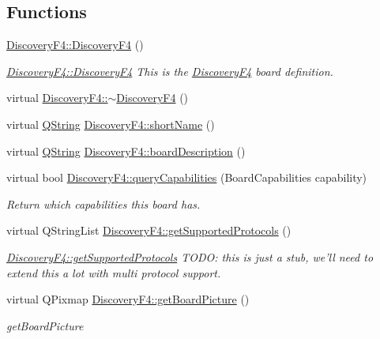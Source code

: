 \subsection*{Functions}
\begin{DoxyCompactItemize}
\item 
\hyperlink{group___boards___stm_gac87884749e97c313a7ae0f297c4fea34}{Discovery\-F4\-::\-Discovery\-F4} ()
\begin{DoxyCompactList}\small\item\em \hyperlink{group___boards___stm_gac87884749e97c313a7ae0f297c4fea34}{Discovery\-F4\-::\-Discovery\-F4} This is the \hyperlink{class_discovery_f4}{Discovery\-F4} board definition. \end{DoxyCompactList}\item 
virtual \hyperlink{group___boards___stm_ga9efdcb4c04776b36e256d689941943ea}{Discovery\-F4\-::$\sim$\-Discovery\-F4} ()
\item 
virtual \hyperlink{group___u_a_v_objects_plugin_gab9d252f49c333c94a72f97ce3105a32d}{Q\-String} \hyperlink{group___boards___stm_ga5c9636450b313e75d14d0277542ca1b7}{Discovery\-F4\-::short\-Name} ()
\item 
virtual \hyperlink{group___u_a_v_objects_plugin_gab9d252f49c333c94a72f97ce3105a32d}{Q\-String} \hyperlink{group___boards___stm_gaaa661c5a3b6c7fe84f8736ce1c090860}{Discovery\-F4\-::board\-Description} ()
\item 
virtual bool \hyperlink{group___boards___stm_ga81561678eef8f622b3cfe9f7af2aa762}{Discovery\-F4\-::query\-Capabilities} (Board\-Capabilities capability)
\begin{DoxyCompactList}\small\item\em Return which capabilities this board has. \end{DoxyCompactList}\item 
virtual Q\-String\-List \hyperlink{group___boards___stm_ga1db1bd4a572120a9b4224f4eb643ef2f}{Discovery\-F4\-::get\-Supported\-Protocols} ()
\begin{DoxyCompactList}\small\item\em \hyperlink{group___boards___stm_ga1db1bd4a572120a9b4224f4eb643ef2f}{Discovery\-F4\-::get\-Supported\-Protocols} T\-O\-D\-O\-: this is just a stub, we'll need to extend this a lot with multi protocol support. \end{DoxyCompactList}\item 
virtual Q\-Pixmap \hyperlink{group___boards___stm_gaec756cbf9ef744354fcb5eb274ba2b94}{Discovery\-F4\-::get\-Board\-Picture} ()
\begin{DoxyCompactList}\small\item\em get\-Board\-Picture \end{DoxyCompactList}\item 

\end{DoxyCompactItemize}
